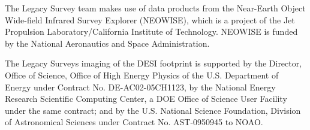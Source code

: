 \documentclass[twocolumn]{aastex631}
\begin{document}
\begin{CJK*}{UTF8}{gbsn}
The Legacy Survey team makes use of data products from the Near-Earth Object Wide-field Infrared Survey Explorer (NEOWISE), which is a project of the Jet Propulsion Laboratory/California Institute of Technology. NEOWISE is funded by the National Aeronautics and Space Administration.

The Legacy Surveys imaging of the DESI footprint is supported by the Director, Office of Science, Office of High Energy Physics of the U.S. Department of Energy under Contract No. DE-AC02-05CH1123, by the National Energy Research Scientific Computing Center, a DOE Office of Science User Facility under the same contract; and by the U.S. National Science Foundation, Division of Astronomical Sciences under Contract No. AST-0950945 to NOAO.




{}



\end{CJK*}
\end{document}
